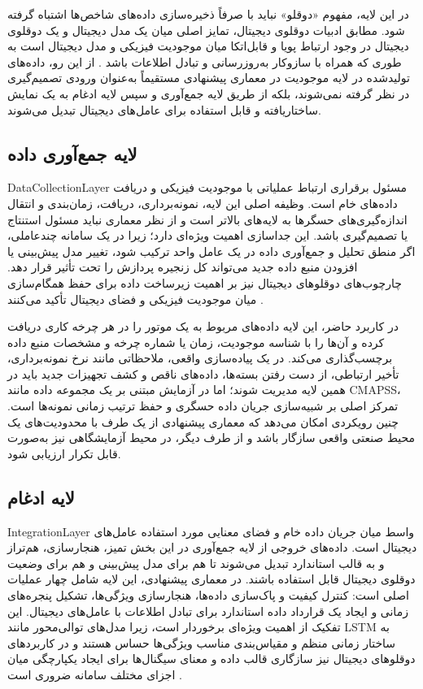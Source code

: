 در این لایه، مفهوم «دوقلو» نباید با صرفاً ذخیره‌سازی داده‌های شاخص‌ها اشتباه گرفته شود. مطابق ادبیات دوقلوی دیجیتال، تمایز اصلی میان یک مدل دیجیتال و یک دوقلوی دیجیتال در وجود ارتباط پویا و قابل‌اتکا میان موجودیت فیزیکی و مدل دیجیتال است به طوری که همراه با سازوکار به‌روزرسانی و تبادل اطلاعات باشد \cite{fuller2020digital,tao2019digital}. از این رو، داده‌های تولیدشده در لایه موجودیت در معماری پیشنهادی مستقیماً به‌عنوان ورودی تصمیم‌گیری در نظر گرفته نمی‌شوند، بلکه از طریق لایه جمع‌آوری و سپس لایه ادغام به یک نمایش ساختاریافته و قابل استفاده برای عامل‌های دیجیتال تبدیل می‌شوند.


\subsection{لایه جمع‌آوری داده}
\label{sec:layer-collection}

\gls{DataCollectionLayer} مسئول برقراری ارتباط عملیاتی با موجودیت فیزیکی و دریافت داده‌های خام است. وظیفه اصلی این لایه، نمونه‌برداری، دریافت، زمان‌بندی و انتقال اندازه‌گیری‌های حسگرها به لایه‌های بالاتر است و از نظر معماری نباید مسئول استنتاج یا تصمیم‌گیری باشد. این جداسازی اهمیت ویژه‌ای دارد؛ زیرا در یک سامانه چندعاملی، اگر منطق تحلیل و جمع‌آوری داده در یک عامل واحد ترکیب شود، تغییر مدل پیش‌بینی یا افزودن منبع داده جدید می‌تواند کل زنجیره پردازش را تحت تأثیر قرار دهد. چارچوب‌های  دوقلو‌های دیجیتال نیز بر اهمیت زیرساخت داده برای حفظ همگام‌سازی میان موجودیت فیزیکی و فضای دیجیتال تأکید می‌کنند \cite{qi2021enabling,fuller2020digital}.

در کاربرد حاضر، این لایه داده‌های مربوط به یک موتور را در هر چرخه کاری دریافت کرده و آن‌ها را با شناسه موجودیت، زمان یا شماره چرخه و مشخصات منبع داده برچسب‌گذاری می‌کند. در یک پیاده‌سازی واقعی، ملاحظاتی مانند نرخ نمونه‌برداری، تأخیر ارتباطی، از دست رفتن بسته‌ها، داده‌های ناقص و کشف تجهیزات جدید باید در همین لایه مدیریت شوند؛ اما در آزمایش مبتنی بر یک مجموعه داده مانند \gls{CMAPSS}، تمرکز اصلی بر شبیه‌سازی جریان داده حسگری و حفظ ترتیب زمانی نمونه‌ها است. چنین رویکردی امکان می‌دهد که معماری پیشنهادی از یک طرف با محدودیت‌های یک محیط صنعتی واقعی سازگار باشد و از طرف دیگر، در محیط آزمایشگاهی نیز به‌صورت قابل تکرار ارزیابی شود.


\subsection{لایه ادغام}
\label{sec:layer-integration}

\gls{IntegrationLayer} واسط میان جریان داده خام و فضای معنایی مورد استفاده عامل‌های دیجیتال است. داده‌های خروجی از لایه جمع‌آوری در این بخش تمیز، هنجارسازی، هم‌تراز و به قالب استاندارد تبدیل می‌شوند تا هم برای مدل پیش‌بینی و هم برای وضعیت دوقلوی دیجیتال قابل استفاده باشند. در معماری پیشنهادی، این لایه شامل چهار عملیات اصلی است: کنترل کیفیت و پاک‌سازی داده‌ها، هنجارسازی ویژگی‌ها، تشکیل پنجره‌های زمانی و ایجاد یک قرارداد داده استاندارد برای تبادل اطلاعات با عامل‌های دیجیتال. این تفکیک از اهمیت ویژه‌ای برخوردار است، زیرا مدل‌های توالی‌محور مانند LSTM به ساختار زمانی منظم و مقیاس‌بندی مناسب ویژگی‌ها حساس هستند \cite{heimes2008recurrent} و در کاربردهای  دوقلو‌های دیجیتال نیز سازگاری قالب داده و معنای سیگنال‌ها برای ایجاد یکپارچگی میان اجزای مختلف سامانه ضروری است \cite{qi2021enabling}.

